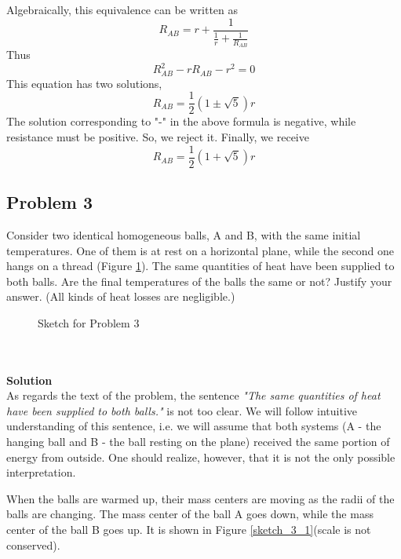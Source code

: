 \documentclass[12pt,a4paper]{book}
\begin{document}
	Algebraically, this equivalence can be written as
	\begin{equation*}
		R_{AB}=r+\frac{1}{\frac{1}{r}+\frac{1}{R_{AB}}}
	\end{equation*}
	Thus
	\begin{equation*}
		R_{AB}^2-rR_{AB}-r^2=0
	\end{equation*}
	This equation has two solutions,
	\begin{equation*}
		R_{AB}=\frac{1}{2}(1\pm\sqrt{5})r
	\end{equation*}
	The solution corresponding to "-" in the above formula is negative, while resistance must be positive. So, we reject it. Finally, we receive
	\begin{equation}
		R_{AB}=\frac{1}{2}(1+\sqrt{5})r
	\end{equation}
	\subsection*{Problem 3}
	Consider two identical homogeneous balls, A and B, with the same initial temperatures. One of them is at rest on a horizontal plane, while the second one hangs on a thread (Figure \ref{sketch_3}). The same quantities of heat have been supplied to both balls. Are the final temperatures of the balls the same or not? Justify your answer. (All kinds of heat losses are negligible.)
	\begin{figure}[!hbtp]
		\centering
		\caption{Sketch for Problem 3}
		\label{sketch_3}
	\end{figure}\\ \\
	\textbf{Solution}\\
	As regards the text of the problem, the sentence \emph{"The same quantities of heat have been supplied to both balls."} is not too clear. We will follow intuitive understanding of this sentence, i.e. we will assume that both systems (A - the hanging ball and B - the ball resting on the plane) received the same portion of energy from outside. One should realize, however, that it is not the only possible interpretation.\par
	When the balls are warmed up, their mass centers are moving as the radii of the balls are changing. The mass center of the ball A goes down, while the mass center of the ball B goes up. It is shown in Figure \ref{sketch_3_1}(scale is not conserved).\par
\end{document}
